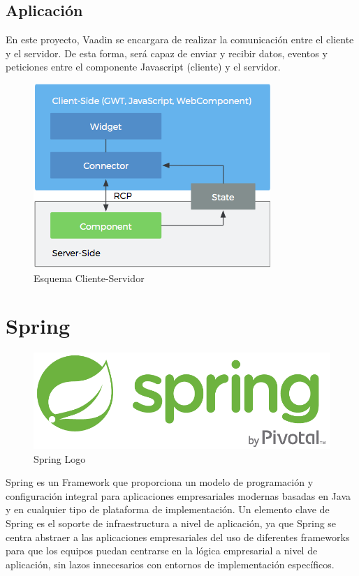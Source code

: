 \documentclass[a4paper,12pt]{book}
\begin{document}
 			\subsection{Aplicación}
 				En este proyecto, Vaadin se encargara de realizar la comunicación entre el cliente y el servidor. De esta forma, será capaz de enviar y recibir datos, eventos y peticiones entre el componente Javascript (cliente) y el servidor.
 			
 			
	 			\begin{figure}[H]
	 				\centering
	 				\includegraphics[scale=1.5]{schema.png}
	 				\caption{Esquema Cliente-Servidor}\label{fig:schema}
	 			\end{figure}
 			
	
	
	\section{Spring}
	
		\begin{figure}[H]
			\centering
			\includegraphics[scale=0.5]{spring.png}
			\caption{Spring Logo}\label{fig:spring}
		\end{figure}
		
		Spring\cite{spring} es un Framework que proporciona un modelo de programación y configuración integral para aplicaciones empresariales modernas basadas en Java y en cualquier tipo de plataforma de implementación. Un elemento clave de Spring es el soporte de infraestructura a nivel de aplicación, ya que Spring se centra abstraer a las aplicaciones empresariales del uso de diferentes frameworks para que los equipos puedan centrarse en la lógica empresarial a nivel de aplicación, sin lazos innecesarios con entornos de implementación específicos.
	
\end{document}
